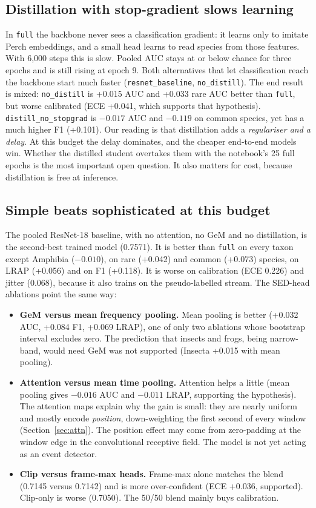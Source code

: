 \documentclass[11pt]{article}
\newcommand{\var}[1]{\texttt{#1}}
\begin{document}
\subsection{Distillation with stop-gradient slows learning}
In \var{full} the backbone never sees a classification gradient: it learns
only to imitate Perch embeddings, and a small head learns to read species from
those features. With 6{,}000 steps this is slow. Pooled AUC stays at or below
chance for three epochs and is still rising at epoch 9. Both alternatives that
let classification reach the backbone start much faster
(\var{resnet\_baseline}, \var{no\_distill}). The end result is mixed:
\var{no\_distill} is +0.015 AUC and +0.033 rare AUC better than \var{full},
but worse calibrated (ECE +0.041, which supports that hypothesis).
\var{distill\_no\_stopgrad} is $-0.017$ AUC and $-0.119$ on common species,
yet has a much higher F1 (+0.101). Our reading is that distillation adds a
\emph{regulariser and a delay}. At this budget the delay dominates, and the
cheaper end-to-end models win. Whether the distilled student overtakes them
with the notebook's 25 full epochs is the most important open question. It
also matters for cost, because distillation is free at inference.

\subsection{Simple beats sophisticated at this budget}
The pooled ResNet-18 baseline, with no attention, no GeM and no distillation,
is the second-best trained model (0.7571). It is better than \var{full} on
every taxon except Amphibia ($-0.010$), on rare (+0.042) and common (+0.073) species, on LRAP (+0.056)
and on F1 (+0.118). It is worse on calibration (ECE 0.226) and jitter (0.068),
because it also trains on the pseudo-labelled stream. The SED-head ablations
point the same way:
\begin{itemize}
  \item \textbf{GeM versus mean frequency pooling.} Mean pooling is better
        (+0.032 AUC, +0.084 F1, +0.069 LRAP), one of only two ablations whose
        bootstrap interval excludes zero. The prediction that insects and
        frogs, being narrow-band, would need GeM was not supported (Insecta
        +0.015 with mean pooling).
  \item \textbf{Attention versus mean time pooling.} Attention helps a little
        (mean pooling gives $-0.016$ AUC and $-0.011$ LRAP, supporting the
        hypothesis). The attention maps explain why the gain is small: they
        are nearly uniform and mostly encode \emph{position}, down-weighting
        the first second of every window (Section~\ref{sec:attn}). The
        position effect may come from zero-padding at the window edge in the
        convolutional receptive field. The model is not yet acting as an event
        detector.
  \item \textbf{Clip versus frame-max heads.} Frame-max alone matches the
        blend (0.7145 versus 0.7142) and is more over-confident (ECE +0.036,
        supported). Clip-only is worse (0.7050). The 50/50 blend mainly buys
        calibration.
\end{itemize}
\end{document}
